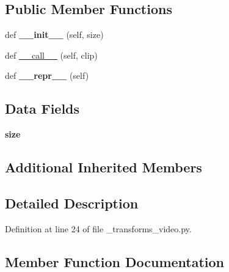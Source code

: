 \subsection*{Public Member Functions}
\begin{DoxyCompactItemize}
\item 
\mbox{\label{classtorchvision_1_1transforms_1_1__transforms__video_1_1RandomCropVideo_aa834a1a6567671d4323ef9b58d6d223d}} 
def {\bfseries \+\_\+\+\_\+init\+\_\+\+\_\+} (self, size)
\item 
def \hyperlink{classtorchvision_1_1transforms_1_1__transforms__video_1_1RandomCropVideo_a4bd7d02f5fe029ca47e6d6c91c4c576e}{\+\_\+\+\_\+call\+\_\+\+\_\+} (self, clip)
\item 
\mbox{\label{classtorchvision_1_1transforms_1_1__transforms__video_1_1RandomCropVideo_a6fef9f9cbfecec5ea84d4caf7203e03c}} 
def {\bfseries \+\_\+\+\_\+repr\+\_\+\+\_\+} (self)
\end{DoxyCompactItemize}
\subsection*{Data Fields}
\begin{DoxyCompactItemize}
\item 
\mbox{\label{classtorchvision_1_1transforms_1_1__transforms__video_1_1RandomCropVideo_afe0ee14f1750a303e01ba3e6e889e333}} 
{\bfseries size}
\end{DoxyCompactItemize}
\subsection*{Additional Inherited Members}


\subsection{Detailed Description}


Definition at line 24 of file \+\_\+transforms\+\_\+video.\+py.



\subsection{Member Function Documentation}
\mbox{\label{classtorchvision_1_1transforms_1_1__transforms__video_1_1RandomCropVideo_a4bd7d02f5fe029ca47e6d6c91c4c576e}} 
